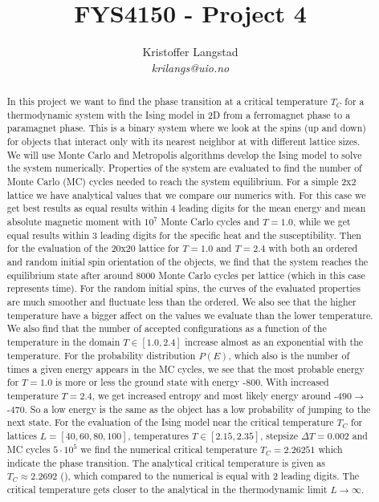 \documentclass[12pt,a4paper,english]{article}
\title{FYS4150 - Project 4}
\date{}
\author{ Kristoffer Langstad\\ \textit{krilangs@uio.no}}
\begin{document}
\maketitle
\begin{abstract}
In this project we want to find the phase transition at a critical temperature $T_C$ for a thermodynamic system with the Ising model in 2D from a ferromagnet phase to a paramagnet phase. This is a binary system where we look at the spins (up and down) for objects that interact only with its nearest neighbor at with different lattice sizes. We will use Monte Carlo and Metropolis algorithms develop the Ising model to solve the system numerically. Properties of the system are evaluated to find the number of Monte Carlo (MC) cycles needed to reach the system equilibrium. For a simple 2x2 lattice we have analytical values that we compare our numerics with. For this case we get best results as equal results within 4 leading digits for the mean energy and mean absolute magnetic moment with $10^7$ Monte Carlo cycles and $T=1.0$, while we get equal results within 3 leading digits for the specific heat and the susceptibility. Then for the evaluation of the 20x20 lattice for $T=1.0$ and $T=2.4$ with both an ordered and random initial spin orientation of the objects, we find that the system reaches the equilibrium state after around 8000 Monte Carlo cycles per lattice (which in this case represents time). For the random initial spins, the curves of the evaluated properties are much smoother and fluctuate less than the ordered. We also see that the higher temperature have a bigger affect on the values we evaluate than the lower temperature. We also find that the number of accepted configurations as a function of the temperature in the domain $T\in[1.0, 2.4]$ increase almost as an exponential with the temperature. For the probability distribution $P(E)$, which also is the number of times a given energy appears in the MC cycles, we see that the most probable energy for $T=1.0$ is more or less the ground state with energy -800. With increased temperature $T=2.4$, we get increased entropy and most likely energy around -490$\rightarrow$ -470. So a low energy is the same as the object has a low probability of jumping to the next state. For the evaluation of the Ising model near the critical temperature $T_C$ for lattices $L=[40,60,80,100]$, temperatures $T\in[2.15, 2.35]$, stepsize $\Delta T=0.002$ and MC cycles $5\cdot10^5$ we find the numerical critical temperature $T_C=2.26251$ which indicate the phase transition. The analytical critical temperature is given as $T_C\approx2.2692$ (\citet{PhysRev.65.117}), which compared to the numerical is equal with 2 leading digits. The critical temperature gets closer to the analytical in the thermodynamic limit $L\rightarrow\infty$.
\end{abstract}
\end{document}
